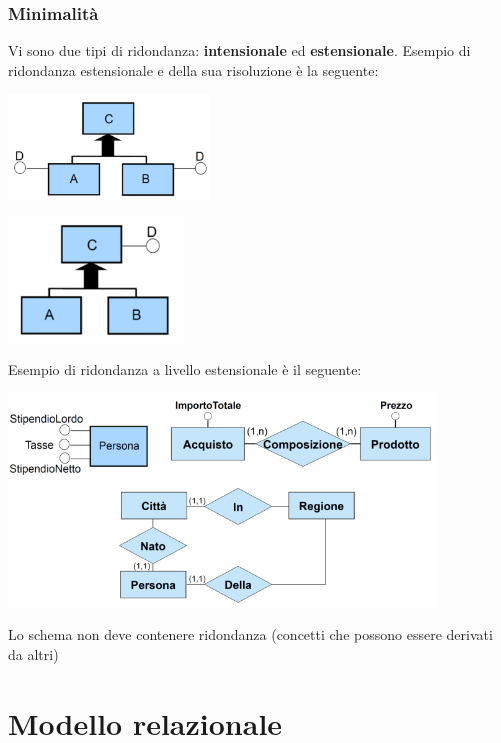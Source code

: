 \documentclass[12pt]{article}
\begin{document}
\subsubsection{Minimalità}
Vi sono due tipi di ridondanza: \textbf{intensionale} ed \textbf{estensionale}.
Esempio di ridondanza estensionale e della sua risoluzione è la seguente:
\begin{center}
    \includegraphics[width = 0.40\textwidth]{Images/72.PNG}
\end{center}
\begin{center}
    \includegraphics[width = 0.35\textwidth]{Images/73.PNG}
\end{center}
Esempio di ridondanza a livello estensionale è il seguente:
\begin{center}
    \includegraphics[width = 0.85\textwidth]{Images/74.PNG}
\end{center}
Lo schema non deve contenere ridondanza (concetti che possono essere derivati da altri)
\section{Modello relazionale}
\end{document}
